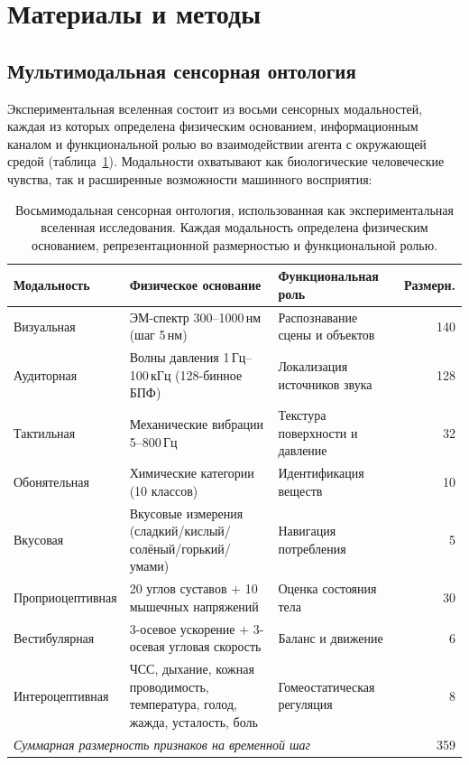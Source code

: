 \documentclass[sn-mathphys-num]{sn-jnl}
\begin{document}
\section{Материалы и методы}
\label{sec:methods}

\subsection{Мультимодальная сенсорная онтология}

Экспериментальная вселенная состоит из восьми сенсорных модальностей, каждая из которых определена физическим основанием, информационным каналом и функциональной ролью во взаимодействии агента с окружающей средой (таблица~\ref{tab:modalities}). Модальности охватывают как биологические человеческие чувства, так и расширенные возможности машинного восприятия:

\begin{table}[tp]
\caption{Восьмимодальная сенсорная онтология, использованная как экспериментальная вселенная исследования. Каждая модальность определена физическим основанием, репрезентационной размерностью и функциональной ролью.}
\label{tab:modalities}
\begin{tabularx}{\textwidth}{lXXr}
\toprule
\textbf{Модальность} & \textbf{Физическое основание} & \textbf{Функциональная роль} & \textbf{Размерн.} \\
\midrule
Визуальная       & ЭМ-спектр 300--1000\,нм (шаг 5\,нм) & Распознавание сцены и объектов & 140 \\
Аудиторная       & Волны давления 1\,Гц--100\,кГц (128-бинное БПФ) & Локализация источников звука & 128 \\
Тактильная       & Механические вибрации 5--800\,Гц & Текстура поверхности и давление & 32 \\
Обонятельная     & Химические категории (10 классов) & Идентификация веществ & 10 \\
Вкусовая         & Вкусовые измерения (сладкий/кислый/солёный/горький/умами) & Навигация потребления & 5 \\
Проприоцептивная & 20 углов суставов + 10 мышечных напряжений & Оценка состояния тела & 30 \\
Вестибулярная    & 3-осевое ускорение + 3-осевая угловая скорость & Баланс и движение & 6 \\
Интероцептивная  & ЧСС, дыхание, кожная проводимость, температура, голод, жажда, усталость, боль & Гомеостатическая регуляция & 8 \\
\midrule
\multicolumn{3}{l}{\textit{Суммарная размерность признаков на временной шаг}} & 359 \\
\bottomrule
\end{tabularx}
\end{table}
\end{document}
